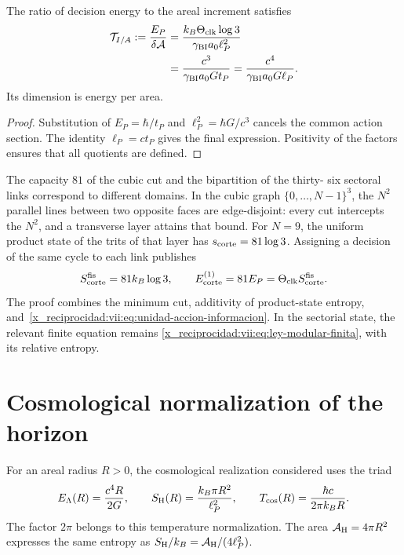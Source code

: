 \begin{proposition}
\label{x_reciprocidad:vii:prop:tension-informacion-area}
The ratio of decision energy to the areal increment satisfies
\begin{equation}
 \begin{aligned}
 \mathcal T_{I/A}:=\frac{E_P}{\delta\mathcal A}
 &=\frac{k_B\Theta_{\rm clk}\log3}{\gamma_{\rm BI}a_0\ell_P^2}\\
 &=\frac{c^3}{\gamma_{\rm BI}a_0G t_P}
  =\frac{c^4}{\gamma_{\rm BI}a_0G\ell_P}.
 \end{aligned}
 \label{x_reciprocidad:vii:eq:tension-informacion-area}
\end{equation}
Its dimension is energy per area.
\end{proposition}
\begin{proof}
Substitution of \(E_P=\hbar/t_P\) and
\(\ell_P^2=\hbar G/c^3\) cancels the common action section.
The identity \(\ell_P=ct_P\) gives the final expression. Positivity
of the factors ensures that all quotients are defined.
\end{proof}

The capacity \(81\) of the cubic cut and the bipartition of the thirty-
six sectoral links correspond to different domains. In the
cubic graph \(\{0,\ldots,N-1\}^3\), the \(N^2\) parallel lines
between two opposite faces are edge-disjoint: every cut
intercepts the \(N^2\), and a transverse layer attains that bound.
For \(N=9\), the uniform product state of the trits of that layer
has \(s_{\rm corte}=81\log3\). Assigning a decision of the
same cycle to each link publishes
\begin{equation}
 S_{\rm corte}^{\rm fis}=81k_B\log3,\qquad
 E_{\rm corte}^{(1)}=81E_P
                  =\Theta_{\rm clk}S_{\rm corte}^{\rm fis}.
 \label{x_reciprocidad:vii:eq:corte-energia-informacion}
\end{equation}
The proof combines the minimum cut, additivity of product-state
entropy, and~\eqref{x_reciprocidad:vii:eq:unidad-accion-informacion}. In the sectorial
state, the relevant finite equation remains
\eqref{x_reciprocidad:vii:eq:ley-modular-finita}, with its relative entropy.

\section{Cosmological normalization of the horizon}
\label{x_reciprocidad:vii:subsec:balance-horizonte}

For an areal radius \(R>0\), the cosmological realization considered
uses the triad
\begin{equation}
 E_\Lambda(R)=\frac{c^4R}{2G},\qquad
 S_{\rm H}(R)=\frac{k_B\pi R^2}{\ell_P^2},\qquad
 T_{\rm cos}(R)=\frac{\hbar c}{2\pi k_BR}.
 \label{x_reciprocidad:vii:eq:horizonte-cosmologico}
\end{equation}
The factor \(2\pi\) belongs to this temperature normalization.
The area \(\mathcal A_{\rm H}=4\pi R^2\) expresses the same entropy
as \(S_{\rm H}/k_B=\mathcal A_{\rm H}/(4\ell_P^2)\).

